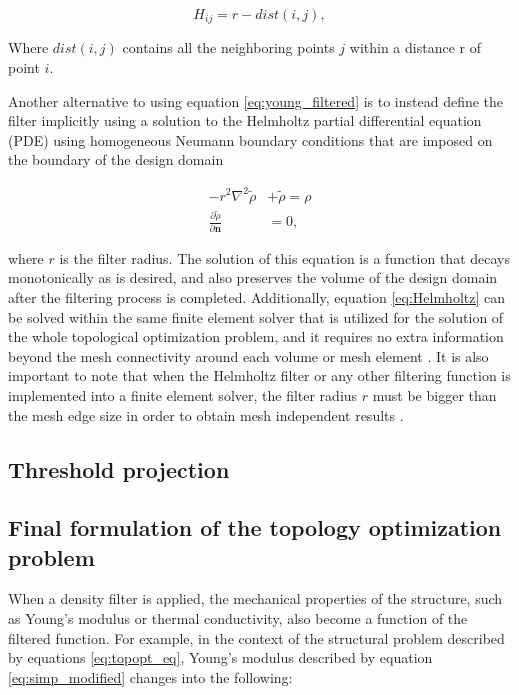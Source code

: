 \documentclass[../main.tex]{subfiles}
\begin{document}
\begin{equation}
  H_{ij} = r -  dist(i, j),
  \label{eq:weighfunction2}
\end{equation}

Where $dist(i,j)$ contains all the neighboring points $j$ within a distance r of point $i$.

Another alternative to using equation \ref{eq:young_filtered} is to instead define the filter implicitly using a solution to the Helmholtz partial differential equation (PDE) using homogeneous Neumann boundary conditions that are imposed on the boundary of the design domain \cite{lazarovFiltersTopologyOptimization2011}

\begin{align}
  -r^2 \nabla ^2 \tilde{\rho} &+ \tilde{\rho} = \rho \label{eq:Helmholtz}\\ 
 \frac{\partial{\tilde{\rho}}}{\partial {\bm{n}}} &= 0 \nonumber,
\end{align}

where $r$ is the filter radius. The solution of this equation is a function that decays monotonically as is desired, and also preserves the volume of the design domain after the filtering process is completed. Additionally, equation \ref{eq:Helmholtz} can be solved within the same finite element solver that is utilized for the solution of the whole topological optimization problem, and it requires no extra information beyond the mesh connectivity around each volume or mesh element \cite{lambeTopologyOptimizationUsing2018}. It is also important to note that when the Helmholtz filter or any other filtering function is implemented into a finite element solver, the filter radius $r$ must be bigger than the mesh edge size in order to obtain mesh independent results \cite{PerformingTopologyOptimization}.

\subsection{Threshold projection}




\subsection{Final formulation of the topology optimization problem}
When a density filter is applied, the mechanical properties of the structure, such as Young's modulus or thermal conductivity, also become a function of the filtered function. For example, in the context of the structural problem described by equations \ref{eq:topopt_eq}, Young's modulus described by equation \ref{eq:simp_modified} changes into the following:
\end{document}
